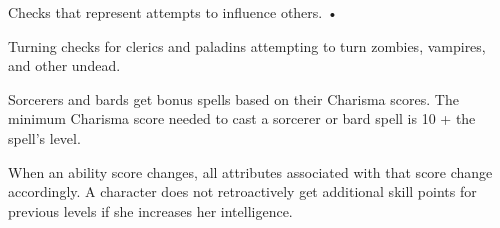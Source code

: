 Checks that represent attempts to influence others. • 

\parindent=7pt
Turning checks for clerics and paladins attempting to turn zombies, vampires, and 
other undead.

\parindent=0pt
Sorcerers and bards get bonus spells based on their Charisma scores. The minimum 
Charisma score needed to cast a sorcerer or bard spell is 10 + the spell's level.

\vspace{12pt}
When an ability score changes, all attributes associated with that score change 
accordingly. A character does not retroactively get additional skill points for 
previous levels if she increases her intelligence.

\newpage


